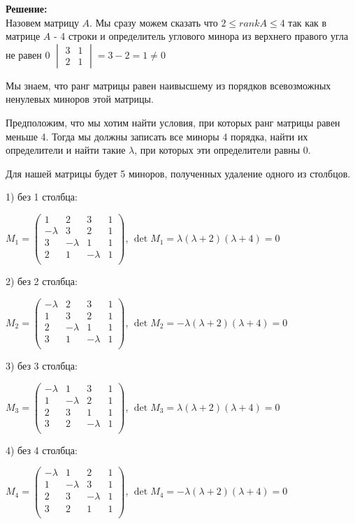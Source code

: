 \documentclass[a4paper,12pt]{article}
\renewcommand{\leq}{\leqslant}
\begin{document}
\begin{enumerate}
\textbf{Решение:}\\
Назовем матрицу $A$. Мы сразу можем сказать что 
$2 \leq rank A \leq 4$ так как в матрице $A$ - 4 строки и определитель углового минора из верхнего правого угла не равен 0 $\begin{vmatrix}
3 & 1  \\ 
2 & 1 
\end{vmatrix}=3-2=1 \neq 0$

Мы знаем, что ранг матрицы равен наивысшему из порядков всевозможных ненулевых миноров этой матрицы.

Предположим, что мы хотим найти условия, при которых ранг матрицы равен меньше 4. Тогда мы должны записать все миноры 4 порядка, найти их определители и найти такие $\lambda$, при которых эти определители равны 0.

Для нашей матрицы будет 5 миноров, полученных удаление одного из столбцов.

1) без 1 столбца:

$M_1 = \begin{pmatrix}
{1}&{2}&{3}&{1}\\
{-\lambda}&{3}&{2}&{1}\\
{3}&{-\lambda}&{1}&{1}\\
{2}&{1}&{-\lambda}&{1}\\
\end{pmatrix}$, $\det M_1 = \lambda(\lambda+2)(\lambda+4)=0$


2) без 2 столбца:

$M_2=\begin{pmatrix}
{-\lambda}&{2}&{3}&{1}\\
{1}&{3}&{2}&{1}\\
{2}&{-\lambda}&{1}&{1}\\
{3}&{1}&{-\lambda}&{1}\\
\end{pmatrix}$, $\det M_2 = -\lambda(\lambda+2)(\lambda+4)=0$

3) без 3 столбца:

$M_3 = \begin{pmatrix}
{-\lambda}&{1}&{3}&{1}\\
{1}&{-\lambda}&{2}&{1}\\
{2}&{3}&{1}&{1}\\
{3}&{2}&{-\lambda}&{1}\\
\end{pmatrix}$, $\det M_3 = \lambda(\lambda+2)(\lambda+4)=0$

4) без 4 столбца:

$M_4=\begin{pmatrix}
{-\lambda}&{1}&{2}&{1}\\
{1}&{-\lambda}&{3}&{1}\\
{2}&{3}&{-\lambda}&{1}\\
{3}&{2}&{1}&{1}\\
\end{pmatrix}$, $\det M_4 = -\lambda(\lambda+2)(\lambda+4)=0$



\end{enumerate}
\end{document}
